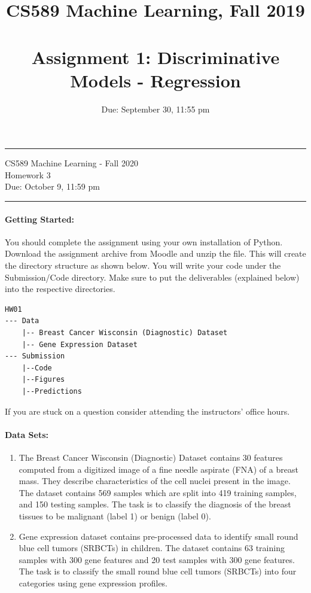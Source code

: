 \documentclass[letterpaper]{article}
\title{CS589 Machine Learning, Fall 2019 \\ \ \\ \large{Assignment 1: Discriminative Models - Regression}}
\date{Due: September 30, 11:55 pm}
\begin{document}
{\centering
  \rule{6.3in}{2pt}
  \vspace{1em}
  {\Large
    CS589 Machine Learning - Fall 2020 \\
    Homework 3 \\
  }
  \vspace{1em}
  Due: October 9, 11:59 pm \\
  \vspace{0.1em}
  \rule{6.3in}{1.5pt}
}
\vspace{1pc}


\paragraph*{Getting Started:} You should complete the assignment using your own installation of Python. Download the assignment archive from Moodle and unzip the file. This will create the directory structure as shown below. You will write your code under the Submission/Code directory. Make sure to put the deliverables (explained below) into the respective directories.

\begin{verbatim}
HW01
--- Data
    |-- Breast Cancer Wisconsin (Diagnostic) Dataset
    |-- Gene Expression Dataset
--- Submission
    |--Code
    |--Figures    
    |--Predictions
\end{verbatim}

If you are stuck on a question consider attending the instructors' office hours.

\paragraph*{Data Sets:} 
\begin{enumerate}
    \item The Breast Cancer Wisconsin (Diagnostic) Dataset contains 30 features computed from a digitized image of a fine needle aspirate (FNA) of a breast mass. They describe characteristics of the cell nuclei present in the image. The dataset contains 569 samples which are split into 419 training samples, and 150 testing samples. The task is to classify the diagnosis of the breast tissues to be malignant (label 1) or benign (label 0). \vspace{12pt}
    \item Gene expression dataset contains pre-processed data to identify small round blue cell tumors (SRBCTs) in children. The dataset contains 63 training samples with 300 gene features and 20 test samples with 300 gene features. The task is to classify the small round blue cell tumors (SRBCTs) into four categories using gene expression profiles.
\end{enumerate}
\end{document}
